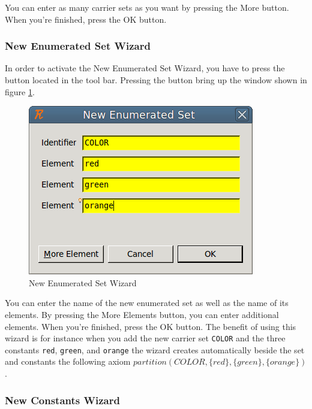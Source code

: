 You can enter as many carrier sets as you want by pressing the \textsf{More} button. When you’re finished, press the \textsf{OK} button. 

\subsubsection{New Enumerated Set Wizard}

In order to activate the \textsf{New Enumerated Set Wizard}, you have to press the  button located in the tool bar. Pressing the button bring up the window shown in figure \ref{fig_ref_01_eventb_editor5}.

\begin{figure}[!h]
\begin{center}
	\includegraphics{img/reference/ref_01_eventb_editor5.png}
	\caption{New Enumerated Set Wizard}
	\label{fig_ref_01_eventb_editor5}
\end{center}
\end{figure}

You can enter the name of the new enumerated set as well as the name of its elements. By pressing the \textsf{More Elements} button, you can enter additional elements. When you’re finished, press the \textsf{OK} button. The benefit of using this wizard is for instance when you add the new carrier set \texttt{COLOR} and the three constants \texttt{red}, \texttt{green}, and \texttt{orange} the wizard creates automatically beside the set and constants the following axiom $partition(COLOR , \{red\}, \{green\}, \{orange\})$.

\subsubsection{New Constants Wizard}

